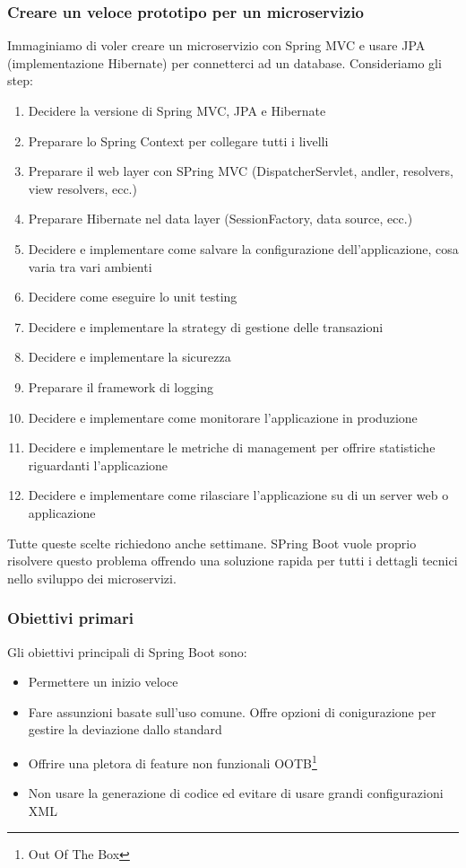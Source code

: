 \documentclass[11pt,a4paper]{book}
\begin{document}
\subsubsection{Creare un veloce prototipo per un microservizio}
Immaginiamo di voler creare un microservizio con Spring MVC e usare JPA (implementazione Hibernate) per connetterci ad un database.
Consideriamo gli step:
\begin{enumerate}
	\item Decidere la versione di Spring MVC, JPA e Hibernate
	\item Preparare lo Spring Context per collegare tutti i livelli
	\item Preparare il web layer con SPring MVC (DispatcherServlet, andler, resolvers, view resolvers, ecc.)
	\item Preparare Hibernate nel data layer (SessionFactory, data source, ecc.)
	\item Decidere e implementare come salvare la configurazione dell'applicazione, cosa varia tra vari ambienti
	\item Decidere come eseguire lo unit testing
	\item Decidere e implementare la strategy di gestione delle transazioni
	\item Decidere e implementare la sicurezza
	\item Preparare il framework di logging
	\item Decidere e implementare come monitorare l'applicazione in produzione
	\item Decidere e implementare le metriche di management per offrire statistiche riguardanti l'applicazione
	\item Decidere e implementare come rilasciare l'applicazione su di un server web o applicazione
\end{enumerate}

Tutte queste scelte richiedono anche settimane. SPring Boot vuole proprio risolvere questo problema offrendo una soluzione rapida per tutti i dettagli tecnici nello sviluppo dei microservizi.

\subsubsection{Obiettivi primari}
Gli obiettivi principali di Spring Boot sono:
\begin{itemize}
	\item Permettere un inizio veloce
	\item Fare assunzioni basate sull'uso comune. Offre opzioni di conigurazione per gestire la deviazione dallo standard
	\item Offrire una pletora di feature non funzionali OOTB\footnote{Out Of The Box}
	\item Non usare la generazione di codice ed evitare di usare grandi configurazioni XML
\end{itemize}
\end{document}
